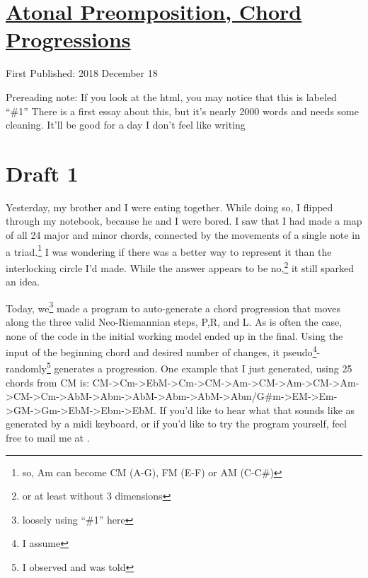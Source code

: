 \documentclass[12pt]{article}[titlepage]
\newcommand{\say}[1]{``\#1''}
\newcommand{\1}{\={a}}
\newcommand{\2}{\={e}}
\newcommand{\3}{\={\i}}
\newcommand{\4}{\=o}
\newcommand{\5}{\=u}
\newcommand{\6}{\={A}}
\renewcommand{\,}{\textsuperscript{,}}
\begin{document}
\doublespacing
\section{\href{atonal-precomposition-2.html}{Atonal Preomposition, Chord Progressions}}
First Published: 2018 December 18

Prereading note: If you look at the html, you may notice that this is labeled \say{2.}
There is a first essay about this, but it's nearly 2000 words and needs some cleaning.
It'll be good for a day I don't feel like writing
\section{Draft 1}
Yesterday, my brother and I were eating together.
While doing so, I flipped through my notebook, because he and I were bored.
I saw that I had made a map of all 24 major and minor chords, connected by the movements of a single note in a triad.\footnote{so, Am can become CM (A-G), FM (E-F) or AM (C-C\#)}
I was wondering if there was a better way to represent it than the interlocking circle I'd made.
While the answer appears to be no,\footnote{or at least without 3 dimensions} it still sparked an idea.

Today, we\footnote{loosely using \say{we} here} made a program to auto-generate a chord progression that moves along the three valid Neo-Riemannian steps, P,R, and L.
As is often the case, none of the code in the initial working model ended up in the final.
Using the input of the beginning chord and desired number of changes, it pseudo\footnote{I assume}-randomly\footnote{I observed and was told} generates a progression.
One example that I just generated, using 25 chords from CM is: CM->Cm->EbM->Cm->CM->Am->CM->Am->CM->Am->CM->Cm->AbM->Abm->AbM->Abm->AbM->Abm/G\#m->EM->Em->GM->Gm->EbM->Ebm->EbM.
If you'd like to hear what that sounds like as generated by a midi keyboard, or if you'd like to try the program yourself, feel free to mail me at .
\end{document}

